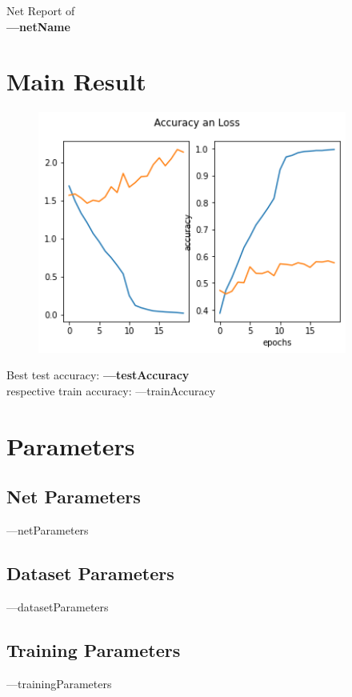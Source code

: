 \documentclass[12pt]{article}
\begin{document}
\begin{center}
    \Large{Net Report of  \\
    \textbf{---netName}}
\end{center}

\section{Main Result}
\begin{figure}[H]
    \centering
    \includegraphics[width = 4in]{src/acc_plot.png}
\end{figure}
\begin{center}
    \large {Best test accuracy: \textbf{---testAccuracy}} \\
    \large {respective train accuracy: ---trainAccuracy} \\
\end{center}
\section{Parameters}
\subsection{Net Parameters}
\begin{table}[H]
    ---netParameters
\end{table}
\subsection{Dataset Parameters}
\begin{table}[H]
    ---datasetParameters
\end{table}
\subsection{Training Parameters}
\begin{table}[H]
    ---trainingParameters
\end{table}
\end{document}
